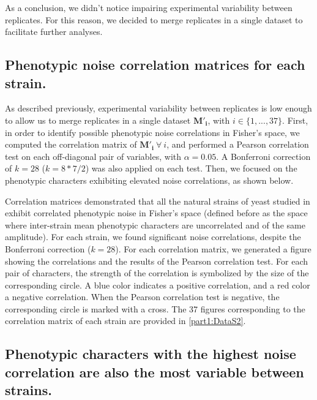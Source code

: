 As a conclusion, we didn't notice impairing experimental variability between replicates. For this reason, we decided to merge replicates in a single dataset to facilitate further analyses.


\subsection*{Phenotypic noise correlation matrices for each strain.}

As described previously, experimental variability between replicates is low enough to allow us to merge replicates in a single dataset $\boldsymbol{M'_i}$, with $i \in \{1,...,37\}$.
First, in order to identify possible phenotypic noise correlations in Fisher's space, we computed the correlation matrix of $\boldsymbol{M'_i}\ \forall\ i$, and performed a Pearson correlation test on each off-diagonal pair of variables, with $\alpha = 0.05$. A Bonferroni correction of $k=28$ ($k=8*7/2$) was also applied on each test.
Then, we focused on the phenotypic characters exhibiting elevated noise correlations, as shown below.

Correlation matrices demonstrated that all the natural strains of yeast studied in \cite{yvert-et-al-2013} exhibit correlated phenotypic noise in Fisher's space (defined before as the space where inter-strain mean phenotypic characters are uncorrelated and of the same amplitude). For each strain, we found significant noise correlations, despite the Bonferroni correction ($k=28$).
For each correlation matrix, we generated a figure showing the correlations and the results of the Pearson correlation test. For each pair of characters, the strength of the correlation is symbolized by the size of the corresponding circle. A blue color indicates a positive correlation, and a red color a negative correlation. When the Pearson correlation test is negative, the corresponding circle is marked with a cross. The 37 figures corresponding to the correlation matrix of each strain are provided in \ref{part1:DataS2}.


\subsection*{Phenotypic characters with the highest noise correlation are also the most variable between strains.}

